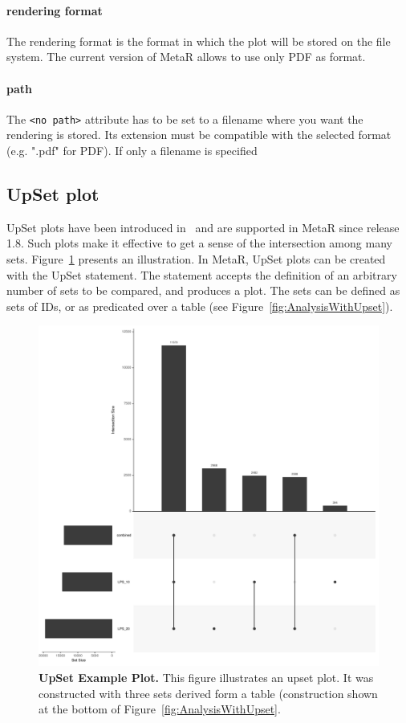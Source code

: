 \paragraph{rendering format}
The rendering format is the format in which the plot will be stored on the file system. The current version of MetaR allows to use only PDF as format. 

\paragraph{path}
The \texttt{<no path>} attribute has to be set to a filename where you want the rendering is stored. Its extension must be compatible with the selected format (e.g. ".pdf" for PDF). If only a filename is specified

\subsection{UpSet plot}
UpSet plots have been introduced in~\cite{Lex2014} and are supported in MetaR since release 1.8. Such plots make it effective to get a sense of the intersection among many sets. Figure~\ref{fig:UpsetPlotExample} presents an illustration.
In MetaR, UpSet plots can be created with the UpSet statement. The statement accepts the definition of an arbitrary number of sets to be compared, and produces a plot. The sets can be defined as sets of IDs, or as predicated over a table (see Figure~\ref{fig:AnalysisWithUpset}).

\begin{figure}[h!tbp]
  \centering
  \includegraphics[width=\figWidthWide]{figures/upset.pdf}
\caption[UpSet Example Plot.]{\textbf{UpSet Example Plot.} This figure illustrates an upset plot. It was constructed with three sets derived form a table (construction shown at the bottom of Figure~\ref{fig:AnalysisWithUpset}.}
\label{fig:UpsetPlotExample}
\end{figure}
 

